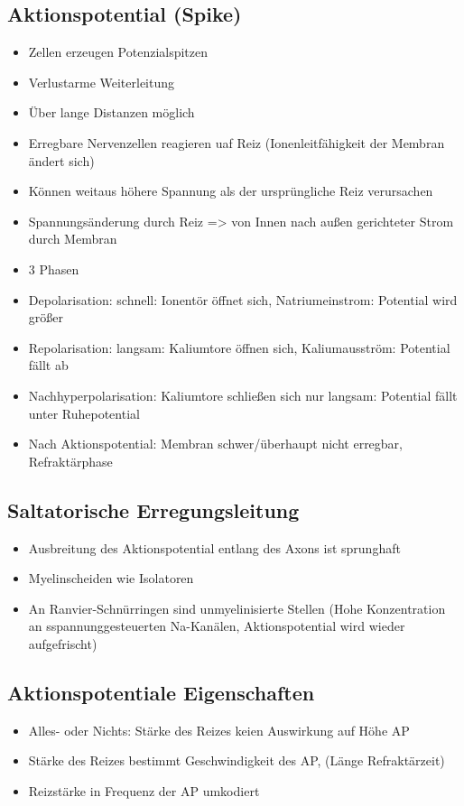 \documentclass[a4paper,10pt,oneside]{article}
\begin{document}
\subsection{Aktionspotential (Spike)}
\begin{itemize}
	\item Zellen erzeugen Potenzialspitzen
	\item Verlustarme Weiterleitung
	\item Über lange Distanzen möglich
	
	\item Erregbare Nervenzellen reagieren uaf Reiz (Ionenleitfähigkeit der Membran ändert sich)
	\item Können weitaus höhere Spannung als der ursprüngliche Reiz verursachen
	\item Spannungsänderung durch Reiz => von Innen nach außen gerichteter Strom durch Membran
	\item 3 Phasen
	\item Depolarisation: schnell: Ionentör öffnet sich, Natriumeinstrom: Potential wird größer
	\item Repolarisation: langsam: Kaliumtore öffnen sich, Kaliumausström: Potential fällt ab
	\item Nachhyperpolarisation: Kaliumtore schließen sich nur langsam: Potential fällt unter Ruhepotential
	\item Nach Aktionspotential: Membran schwer/überhaupt nicht erregbar, Refraktärphase
	
\end{itemize}

\subsection{Saltatorische Erregungsleitung}
\begin{itemize}
	\item Ausbreitung des Aktionspotential entlang des Axons ist sprunghaft
	\item Myelinscheiden wie Isolatoren
	\item An Ranvier-Schnürringen sind unmyelinisierte Stellen (Hohe Konzentration an sspannunggesteuerten Na-Kanälen, Aktionspotential wird wieder aufgefrischt)
	
\end{itemize}

\subsection{Aktionspotentiale Eigenschaften}
\begin{itemize}
	\item Alles- oder Nichts: Stärke des Reizes keien Auswirkung auf Höhe AP
	\item Stärke des Reizes bestimmt Geschwindigkeit des AP, (Länge Refraktärzeit)
	\item Reizstärke in Frequenz der AP umkodiert
\end{itemize}
\end{document}
